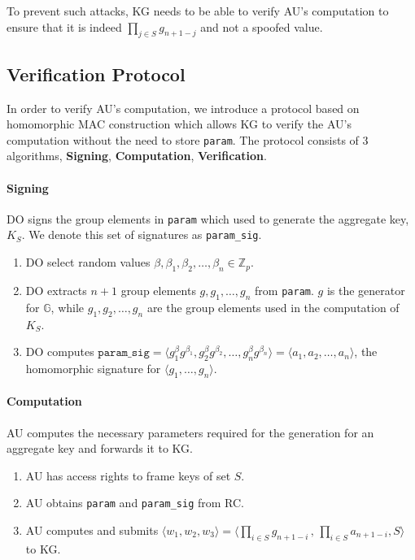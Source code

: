 \documentclass[hyp,a4paper,12pt,openbib]{socreport}
\begin{document}
To prevent such attacks, KG needs to be able to verify AU's computation to ensure that it is indeed $\displaystyle \prod_{j \in S} g_{n+1-j}$ and not a spoofed value.

\subsection{Verification Protocol}
\label{sec:verify}
In order to verify AU's computation, we introduce a protocol based on homomorphic MAC construction which allows KG to verify the AU's computation without the need to store \texttt{param}. The protocol consists of 3 algorithms, \textbf{Signing}, \textbf{Computation}, \textbf{Verification}.


\paragraph{Signing} DO signs the group elements in \texttt{param} which used to generate the aggregate key, $K_S$. We denote this set of signatures as \texttt{param\_sig}.
\begin{enumerate}
\item DO select random values $\beta, \beta_1, \beta_2, \dots, \beta_n \in \mathbb{Z}_{p}$.
\item DO extracts $n+1$ group elements $g, g_1, \dots, g_n$ from \texttt{param}. $g$ is the generator for $\mathbb{G}$, while $g_1, g_2, \dots , g_n$ are the group elements used in the computation of $K_S$. 
\item DO computes $\texttt{param\_sig} = \langle g_1^{\beta}  g^{\beta_1}, g_2^{\beta}  g^{\beta_2}, \dots, g_n^{\beta}  g^{\beta_n} \rangle = \langle a_1, a_2, \dots, a_n \rangle$, the homomorphic signature for $\langle g_1, \dots , g_n \rangle$.
\end{enumerate}


\paragraph{Computation} AU computes the necessary parameters required for the generation for an aggregate key and forwards it to KG. 

\begin{enumerate}
\item AU has access rights to frame keys of set $S$.
\item AU obtains \texttt{param} and \texttt{param\_sig} from RC.
\item AU computes and submits $\langle w_1, w_2, w_3 \rangle = \displaystyle \langle \displaystyle \prod_{i \in S} g_{n+1-i} \, , \, \prod_{i \in S} a_{n+1-i}, S\rangle$ to KG. 

\end{enumerate}
\end{document}
